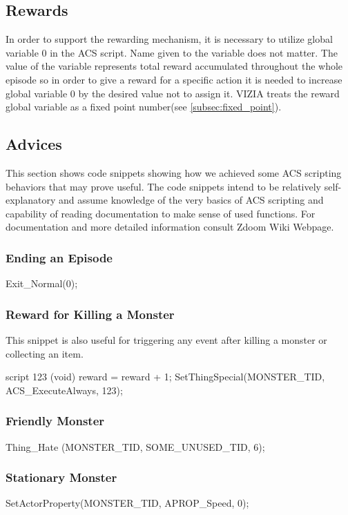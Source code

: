 	\subsection{Rewards}
		In order to support the rewarding mechanism, it is necessary to utilize global variable 0 in the ACS script. Name given to the variable does not matter. The value of the variable represents total reward accumulated throughout the whole episode so in order to give a reward for a specific action it is needed to increase global variable 0 by the desired value not to assign it. VIZIA treats the reward global variable as a fixed point number(see \ref{subsec:fixed_point}).

	\subsection{Advices}
		This section shows code snippets showing how we achieved some ACS scripting behaviors that may prove useful. The code snippets intend to be relatively self-explanatory and assume knowledge of the very basics of ACS scripting and capability of reading documentation to make sense of used functions. For documentation and more detailed information consult Zdoom Wiki Webpage\cite{zdoom-wiki}.

		\subsubsection*{Ending an Episode}

			\begin{clinee}
Exit_Normal(0);
			\end{clinee}
		\subsubsection*{Reward for Killing a Monster} This snippet is also useful for triggering any event after killing a monster or collecting an item.
			\begin{clinee}
script 123 (void)
{
	reward = reward + 1;
}
SetThingSpecial(MONSTER_TID, ACS_ExecuteAlways, 123);
			\end{clinee}
\subsubsection*{Friendly Monster}
			\begin{clinee}
Thing_Hate (MONSTER_TID, SOME_UNUSED_TID, 6);
			\end{clinee}
		\subsubsection*{Stationary Monster}
			\begin{clinee}
SetActorProperty(MONSTER_TID, APROP_Speed, 0);
			\end{clinee}

